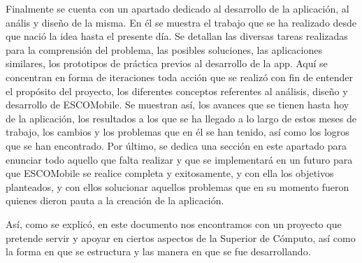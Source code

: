 \noindent
Finalmente se cuenta con un apartado dedicado al desarrollo de la aplicación, al anális y diseño de la misma. En él se muestra el trabajo que se ha realizado desde que nació la idea hasta el presente día. Se detallan las diversas tareas realizadas para la comprensión del problema, las posibles soluciones, las aplicaciones similares, los prototipos de práctica previos al desarrollo de la app. Aquí se concentran en forma de iteraciones toda acción que se realizó con fin de entender el propósito del proyecto, los diferentes conceptos referentes al análisis, diseño y desarrollo de ESCOMobile. Se muestran así, los avances que se tienen hasta hoy de la aplicación, los resultados a los que se ha llegado a lo largo de estos meses de trabajo, los cambios y los problemas que en él se han tenido, así como los logros que se han encontrado. Por último, se dedica una sección en este apartado para enunciar todo aquello que falta realizar y que se implementará en un futuro para que ESCOMobile se realice completa y exitosamente, y con ella los objetivos planteados, y con ellos solucionar aquellos problemas que en su momento fueron quienes dieron pauta a la creación de la aplicación. 

\noindent
Así, como se explicó, en este documento nos encontramos con un proyecto que pretende servir y apoyar en ciertos aspectos de la Superior de Cómputo, así como la forma en que se estructura y las manera en que se fue desarrollando. 

